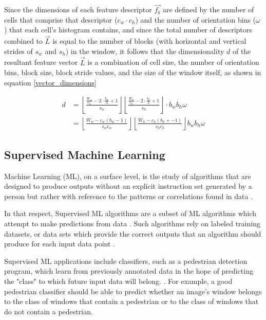 Since the dimensions of each feature descriptor $\vec{f_b}$ are defined by the number of cells that comprise that descriptor ($c_w\cdot c_h$) and the number of orientation bins ($\omega$) that each cell's histogram contains, and since the total number of descriptors combined to $\vec{L}$ is equal to the number of blocks (with horizontal and vertical strides of $s_w$ and $s_h$) in the window, it follows that the dimensionality $d$ of the resultant feature vector $\vec{L}$ is a combination of cell size, the number of orientation bins, block size, block stride values, and the size of the window itself, as shown in equation \ref{vector_dimensions}

\begin{equation}
    \label{vector_dimensions}
    \begin{split}
    d &= \left\lfloor \frac{\frac{W_w}{c_w}-2\cdot\frac{b_w}{2}+1}{s_w} \right\rfloor\left\lfloor \frac{\frac{W_h}{c_h}-2\cdot\frac{b_h}{2}+1}{s_h} \right\rfloor\cdot b_w b_h\omega \\ &= \left\lfloor  \frac{W_w- c_w(b_w-1)}{s_w c_w}  \right\rfloor \left\lfloor   \frac{W_h -c_h(b_h +-1)}{s_h c_h} \right\rfloor b_w b_h\omega
    \end{split}
\end{equation}

\subsection{Supervised Machine Learning}\label{sec:supervised_ml}

Machine Learning (ML), on a surface level, is the study of algorithms that are designed to produce outputs without an explicit instruction set generated by a person but rather with reference to the patterns or correlations found in data \cite{what_is_ml}. 

In that respect, Supervised ML algorithms are a subset of ML algorithms which attempt to make predictions from data \cite{supervised_learning}. Such algorithms rely on labeled training datasets, or data sets which provide the correct outputs that an algorithm should produce for each input data point \cite {supervised_learning}. 

Supervised ML applications include classifiers, such as a pedestrian detection program, which learn from previously annotated data in the hope of predicting the "class" to which future input data will belong. \cite{derek_2020_svm}. For example, a good pedestrian classifier should be able to predict whether an image's window belongs to the class of windows that contain a pedestrian or to the class of windows that do not contain a pedestrian.

